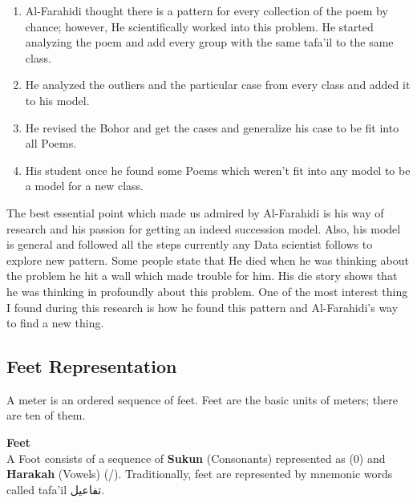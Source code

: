 \begin{enumerate}


\item Al-Farahidi thought there is a pattern for every collection of the poem by chance; however, He scientifically worked into this problem. He started analyzing the poem and add every group with the same tafa'il to the same class.
\item He analyzed the outliers and the particular case from every class and added it to his model.
\item He revised the Bohor and get the cases and generalize his case to be fit into all Poems.
\item His student once he found some Poems which weren't fit into any model to be a model for a new class.

\end{enumerate}
The best essential point which made us admired by Al-Farahidi is his way of research and his passion for getting an indeed succession model. Also, his model is general and followed all the steps currently any Data scientist follows to explore new pattern. Some people state that He died when he was thinking about the problem he hit a wall which made trouble for him. His die story shows that he was thinking in profoundly about this problem. One of the most interest thing I found during this research is how he found this pattern and Al-Farahidi’s way to find a new thing.

    \newpage
    
    \subsection{Feet Representation}
    A meter is an ordered sequence of feet. Feet are the basic
units of meters; there are ten of them.
\begin{definition}\label{def:feet}
  \textbf{Feet} \hfill \\  A Foot consists of
a sequence of \textbf{Sukun} (Consonants) represented as (0) and \textbf{Harakah} (Vowels) (/). Traditionally, feet are represented by mnemonic words called tafa’il \textarabic{تفاعيل}.
\end{definition}

